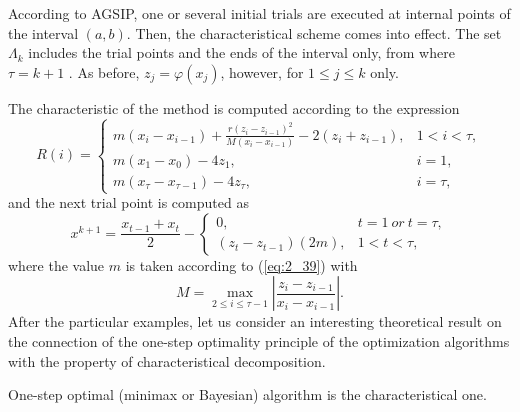 According to AGSIP, one or several initial trials are executed at internal points of the interval $(a,b)$. Then, the characteristical scheme comes into effect. The set $\Lambda_k$  includes the trial points and the ends of the interval only, from where $\tau=k+1$ . As before, $z_j=\varphi(x_j)$, however, for $1\leq j\leq k$  only.

The characteristic of the method is computed according to the expression
\begin{equation}
\label{eq:2_41}
R(i) =\begin{cases}
    m(x_i-x_{i-1})+\frac{r(z_i-z_{i-1})^2}{M(x_i-x_{i-1})}-2(z_i+z_{i-1}), & 1<i<\tau, \\
    m(x_1-x_0)-4z_1, & i=1, \\
		m(x_\tau-x_{\tau-1})-4z_\tau, & i=\tau,
  \end{cases} 
\end{equation}
and the next trial point is computed as 
\begin{equation}
\label{eq:2_42}
x^{k+1} =\frac{x_{t-1}+x_t}{2}-
\begin{cases}
    0, & t=1\ or\ t=\tau, \\
    (z_t-z_{t-1})(2m), & 1<t<\tau,
  \end{cases} 
\end{equation}
where the value $m$ is taken according to (\ref{eq:2_39}) with 
\begin{displaymath}
M=\max_{2\leq i\leq \tau-1}\left|\frac{z_i-z_{i-1}}{x_i-x_{i-1}}\right|.
\end{displaymath}
After the particular examples, let us consider an interesting theoretical result on the connection of the one-step optimality principle of the optimization algorithms with the property of  characteristical decomposition.
\begin{theorem} 
\label{theor:2_1}
One-step optimal (minimax or Bayesian) algorithm is the characteristical one.
\end{theorem}
